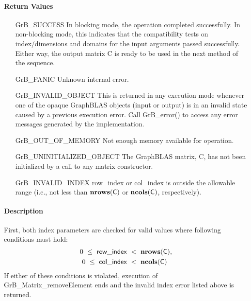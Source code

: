 \paragraph{Return Values}

\begin{itemize}[leftmargin=2.1in]
    \item[{\sf GrB\_SUCCESS}]         In blocking mode, the operation completed
    successfully. In non-blocking mode, this indicates that the compatibility 
    tests on index/dimensions and domains for the input arguments passed successfully. 
    Either way, the output matrix {\sf C} is ready to be used in the next method of 
    the sequence.

    \item[{\sf GrB\_PANIC}]   Unknown internal error.
    
    \item[{\sf GrB\_INVALID\_OBJECT}] This is returned in any execution mode 
    whenever one of the opaque GraphBLAS objects (input or output) is in an invalid 
    state caused by a previous execution error.  Call {\sf GrB\_error()} to access 
    any error messages generated by the implementation.

    \item[{\sf GrB\_OUT\_OF\_MEMORY}]  Not enough memory available for operation.
    
    \item[{\sf GrB\_UNINITIALIZED\_OBJECT}]  The GraphBLAS matrix, {\sf C}, has 
    not been initialized by a call to any matrix constructor.

    \item[{\sf GrB\_INVALID\_INDEX}]  {\sf row\_index} or {\sf col\_index} is 
    outside the allowable range (i.e., not less than $\mathbf{nrows}({\sf C})$ or
    $\mathbf{ncols}({\sf C})$, respectively).
\end{itemize}

\paragraph{Description}

First, both index parameters are checked for valid values where following
conditions must hold:
\[
\begin{aligned}
    0\ \leq\ {\sf row\_index} & \ <\ \mathbf{nrows}({\sf C}), \\
    0\ \leq\ {\sf col\_index} & \ <\ \mathbf{ncols}({\sf C})
\end{aligned}
\]
If either of these conditions is violated, execution of 
{\sf GrB\_Matrix\_removeElement} ends and the invalid 
index error listed above is returned. 

